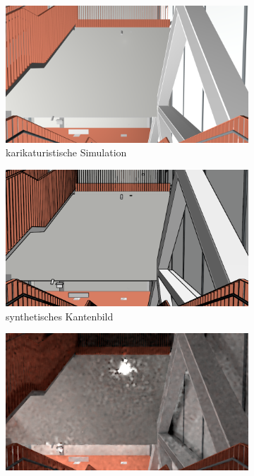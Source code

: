 \begin{figure}
	\centering
	\begin{subfigure}[t]{0.24\linewidth}
		\centering
		\includegraphics[width=\linewidth]{images/syn_dataset/b00188.png}
		\caption{karikaturistische Simulation}
		\label{subfig:cartoonish}
	\end{subfigure}
	\hfill
	\begin{subfigure}[t]{0.24\linewidth}
		\centering
		\includegraphics[width=\linewidth]{images/syn_dataset/e00188.png}
		\caption{synthetisches \hspace{1cm} Kantenbild}
		\label{subfig:edge}
	\end{subfigure}
	\hfill
	\begin{subfigure}[t]{0.24\linewidth}
		\centering
		\includegraphics[width=\linewidth]{images/syn_dataset/c00188.png}

\end{subfigure}
\end{figure}
